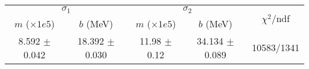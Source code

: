 \begin{tabular}{cc|cc||c}
\multicolumn{2}{c|}{$\sigma_1$} & \multicolumn{2}{|c}{$\sigma_2$} & \multirow{2}{*}{$\chi^2/$ndf} \\
$m$ ($\times1e5$) & $b$ (MeV) & $m$ ($\times1e5$) & $b$ (MeV) & \\
\hline
8.592 $\pm$ 0.042 & 18.392 $\pm$ 0.030 & 11.98 $\pm$ 0.12 & 34.134 $\pm$ 0.089 & 10583/1341\\
\end{tabular}
